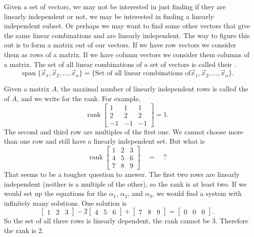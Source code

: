Given a set of vectors, we may not be interested in just finding if they
are linearly independent or not, we may be interested in finding a linearly
independent subset.  Or perhaps we may want to find some other vectors that
give the same linear combinations and are linearly independent.
The way to figure this out is to form a matrix out of our vectors.  If we
have row vectors we consider them as rows of a matrix.  If we have
column vectors we consider them columns of a matrix.
The set of all linear combinations of a set of vectors is called their
\emph{}.
\begin{equation*}
\operatorname{span} \bigl\{ \vec{x}_1, \vec{x}_2 , \ldots , \vec{x}_n \bigr\}
=
\bigl\{
\text{Set of all linear combinations of
$\vec{x}_1, \vec{x}_2 , \ldots , \vec{x}_n$}
\bigr\} .
\end{equation*}


Given a matrix $A$, the maximal number of linearly independent rows is called
the \emph{} of $A$, and we write
 for the rank.
For example,
\begin{equation*}
\operatorname{rank}
\begin{bmatrix}
1 & 1 & 1 \\
2 & 2 & 2 \\
-1 & -1 & -1
\end{bmatrix}
=
1 .
\end{equation*}
The second and third
row are multiples of the first one.  We cannot choose more than one row and
still have a linearly independent set.   But what is
\begin{equation*}
\operatorname{rank}
\begin{bmatrix}
1 & 2 & 3 \\
4 & 5 & 6 \\
7 & 8 & 9
\end{bmatrix} \quad = \quad ?
\end{equation*}
That seems to be a tougher question to answer.  The
first two rows are linearly independent (neither is a multiple of the other),
so the rank is at least
two.  If we would set up the equations for the $\alpha_1$, $\alpha_2$, and
$\alpha_3$, we would find a system with infinitely many solutions.  One
solution is
\begin{equation*}
\begin{bmatrix}
1 & 2 & 3
\end{bmatrix} -2
\begin{bmatrix}
4 & 5 & 6
\end{bmatrix} +
\begin{bmatrix}
7 & 8 & 9
\end{bmatrix} =
\begin{bmatrix}
0 & 0 & 0
\end{bmatrix} .
\end{equation*}
So the set of all three rows is linearly dependent, the rank cannot be
3.  Therefore the rank is 2.


